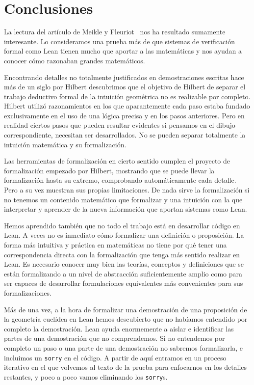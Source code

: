 \section{Conclusiones}

La lectura del artículo de Meikle y
Fleuriot~\cite{meikleFormalizingHilbertGrundlagen2003} nos ha resultado
sumamente interesante. Lo consideramos una prueba más de que sistemas de
verificación formal como Lean tienen mucho que aportar a las matemáticas
y nos ayudan a conocer cómo razonaban grandes matemáticos.

Encontrando detalles no totalmente justificados en demostraciones escritas hace
más de un siglo por Hilbert descubrimos que el objetivo de Hilbert de separar el
trabajo deductivo formal de la intuición geométrica no es realizable por
completo. Hilbert utilizó razonamientos en los que aparantemente cada paso
estaba fundado exclusivamente en el uso de una lógica precisa y en los pasos
anteriores. Pero en realidad ciertos pasos que pueden resultar
evidentes si pensamos en el dibujo correspondiente, necesitan ser desarrollados.
No se pueden separar totalmente la intuición matemática y su formalización.

Las herramientas de formalización en cierto sentido cumplen el proyecto de
formalización empezado por Hilbert, mostrando que se puede llevar la
formalización hasta su extremo, comprobando automáticamente cada detalle. Pero a
su vez muestran sus propias limitaciones. De nada sirve la formalización si no
tenemos un contenido matemático que formalizar y una intuición con la que
interpretar y aprender de la nueva información que aportan sistemas como Lean.

Hemos aprendido también que no todo el trabajo está en desarrollar código en
Lean. A veces no es inmediato cómo formalizar una definición o proposición. La
forma más intuitiva y práctica en matemáticas no tiene por qué tener una
correspondencia directa con la formalización que tenga más sentido realizar en
Lean. Es necesario conocer muy bien las teorías, conceptos y definiciones que
se están formalizando a un nivel de abstracción suficientemente amplio como
para ser capaces de desarrollar formulaciones equivalentes más convenientes para
sus formalizaciones.

Más de una vez, a la hora de formalizar una demostración de una proposición de
la geometría euclídea en Lean hemos descubierto que no habíamos
entendido por completo la demostración. Lean ayuda enormemente a aislar
e identificar las partes de una demostración que no comprendemos. Si no
entendemos por completo un paso o una parte de una demostración no sabremos
formalizarla, e incluimos un \lstinline{sorry} en el código. A partir de aquí
entramos en un proceso iterativo en el que volvemos al texto de la prueba para
enfocarnos en los detalles restantes, y poco a poco vamos eliminando los
\lstinline{sorry}s.

